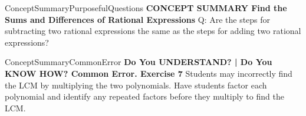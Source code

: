 \documentclass{article}
\newenvironment{te-addendum}[2]{}{}     %
\newcommand{\answer}[1]{}               %
\newcommand{\te}[1]{}                   %
\begin{document}
\begin{te-addendum}{ConceptSummary}{PurposefulQuestions}
\textbf{CONCEPT SUMMARY Find the Sums and Differences of Rational Expressions}
Q: Are the steps for subtracting two rational expressions the same as the steps for adding two rational expressions?
\answer{When subtracting two rational expressions, you must remember to distribute the negative sign to each term in the numerator of the expression being subtracted.}
\te{Concept Summary, Do You Understand, and Do You Know How are available at SavvasRealize.com. Presentation; Practice.}
\end{te-addendum}
\begin{te-addendum}{ConceptSummary}{CommonError}
\textbf{Do You UNDERSTAND? | Do You KNOW HOW? Common Error. Exercise 7}
Students may incorrectly find the LCM by multiplying the two polynomials. Have students factor each polynomial and identify any repeated factors before they multiply to find the LCM.
\end{te-addendum}
\end{document}
